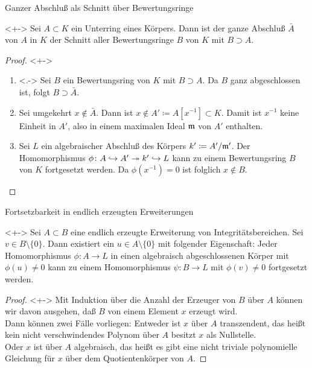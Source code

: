 \begin{frame}{Ganzer Abschluß als Schnitt über Bewertungsringe}
	\begin{corollary}<+->
		Sei \(A \subset K\) ein Unterring eines Körpers. Dann ist
		der ganze Abschluß \(\bar A\) von \(A\) in \(K\) der Schnitt aller
		Bewertungsringe \(B\) von \(K\) mit \(B \supset A\).
	\end{corollary}
	\begin{proof}<+->
		\begin{enumerate}[<+->]
		\item<.->
			Sei \(B\) ein Bewertungsring von \(K\) mit \(B \supset A\). Da
			\(B\) ganz abgeschlossen ist, folgt \(B \supset \bar A\).
		\item
			Sei umgekehrt \(x \notin \bar A\). Dann ist \(x \notin A' \coloneqq
			A[x^{-1}] \subset K\). Damit ist \(x^{-1}\) keine Einheit in \(A'\),
			also in einem maximalen Ideal \(\mathfrak{m}\) von \(A'\) enthalten.
		\item
			Sei \(L\) ein algebraischer Abschluß des Körpers \(k' \coloneqq
			A'/\mathfrak{m}'\). Der Homomorphismus
			\(\phi\colon A \hookrightarrow A' \twoheadrightarrow k' \hookrightarrow L\) kann zu einem
			Bewertungsring \(B\) von \(K\) fortgesetzt werden. Da
			\(\phi(x^{-1}) = 0\) ist folglich \(x \notin B\).
			\qedhere
		\end{enumerate}
	\end{proof}
\end{frame}

\begin{frame}{Fortsetzbarkeit in endlich erzeugten Erweiterungen}
	\begin{proposition}<+->
		Sei \(A \subset B\) eine endlich erzeugte Erweiterung von
		Integritätsbereichen. Sei \(v \in B \setminus \{0\}\). Dann existiert
		ein \(u \in A \setminus \{0\}\) mit folgender Eigenschaft: Jeder
		Homomorphismus \(\phi\colon A \to L\) in einen algebraisch
		abgeschlossenen Körper mit \(\phi(u) \neq 0\) kann zu einem
		Homomorphismus \(\psi\colon B \to L\) mit \(\phi(v) \neq 0\)
		fortgesetzt werden.
	\end{proposition}
	\begin{proof}<+->
		\renewcommand\qedsymbol{}
		Mit Induktion über die Anzahl der Erzeuger von \(B\) über \(A\)
		können wir davon ausgehen, daß \(B\) von einem Element \(x\)
		erzeugt wird.
		\\
		Dann können zwei Fälle vorliegen: Entweder ist \(x\) über \(A\)
		transzendent, das heißt kein nicht
		verschwindendes Polynom über \(A\) besitzt \(x\) als Nullstelle.
		\\
		Oder \(x\) ist über \(A\) algebraisch, das heißt es gibt eine nicht
		triviale polynomielle Gleichung für \(x\) über dem Quotientenkörper von \(A\).
	\end{proof}
\end{frame}

